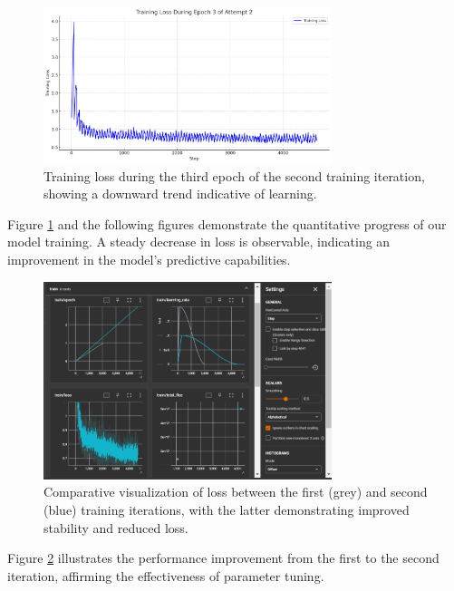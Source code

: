 \documentclass[]{article}
\begin{document}
\begin{figure}[h!]
\centering
\includegraphics[width=0.75\textwidth]{training_loss_epoch3_attempt2.png}
\caption{Training loss during the third epoch of the second training iteration, showing a downward trend indicative of learning.}
\label{fig:training_loss}
\end{figure}

Figure \ref{fig:training_loss} and the following figures demonstrate the quantitative progress of our model training. A steady decrease in loss is observable, indicating an improvement in the model's predictive capabilities.

\begin{figure}[h!]
\centering
\includegraphics[width=0.75\textwidth]{training_comparative_loss.png}
\caption{Comparative visualization of loss between the first (grey) and second (blue) training iterations, with the latter demonstrating improved stability and reduced loss.}
\label{fig:comparative_loss}
\end{figure}

Figure \ref{fig:comparative_loss} illustrates the performance improvement from the first to the second iteration, affirming the effectiveness of parameter tuning.
\end{document}
